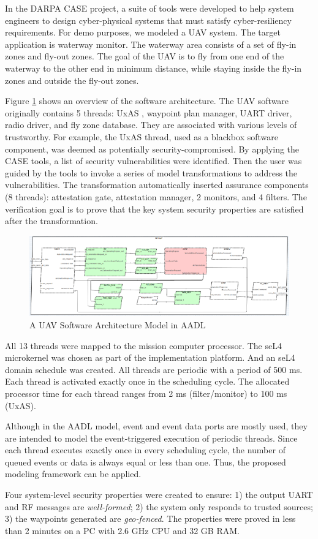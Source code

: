 In the DARPA CASE project, a suite of tools were developed to help system engineers to design cyber-physical systems that must satisfy cyber-resiliency requirements.
For demo purposes, we modeled a UAV system. The target application is waterway monitor. The waterway area consists of a set of fly-in zones and fly-out zones. The goal of the UAV is to fly from one end of the waterway to the other end in minimum distance, while staying inside the fly-in zones and outside the fly-out zones.
 
Figure \ref{SW} shows an overview of the software architecture. The UAV software originally contains 5 threads: UxAS \cite{uxas}, waypoint plan manager, UART driver, radio driver, and fly zone database. They are associated with various levels of trustworthy. For example, the UxAS thread, used as a blackbox software component, was deemed as potentially security-compromised.
By applying the CASE tools, a list of security vulnerabilities were identified. Then the user was guided by the tools to invoke a series of model transformations to address the vulnerabilities. The transformation automatically inserted assurance components (8 threads): attestation gate, attestation manager, 2 monitors, and 4 filters. The verification goal is to prove that the key system security properties are satisfied after the transformation.

\begin{figure}[ht!]
\centering
\includegraphics[width=120mm]{sw2.png}
\caption{A UAV Software Architecture Model in AADL \label{SW}}
\end{figure}

All 13 threads were mapped to the mission computer processor. The seL4 microkernel was chosen as part of the implementation platform. And an seL4 domain schedule was created. All threads are periodic with a period of 500 ms. Each thread is activated exactly once in the scheduling cycle. The allocated processor time for each thread ranges from 2 ms (filter/monitor) to 100 ms (UxAS).

Although in the AADL model, event and event data ports are mostly used, they are intended to model the event-triggered execution of periodic threads. 
Since each thread executes exactly once in every scheduling cycle, the number of queued events or data is always equal or less than one. 
Thus, the proposed modeling framework can be applied.

Four system-level security properties were created to ensure: 1) the output UART and RF messages are \emph{well-formed}; 2) the system only responds to trusted sources; 3) the waypoints generated are \emph{geo-fenced}. The properties were proved in less than 2 minutes on a PC with 2.6 GHz CPU and 32 GB RAM.

